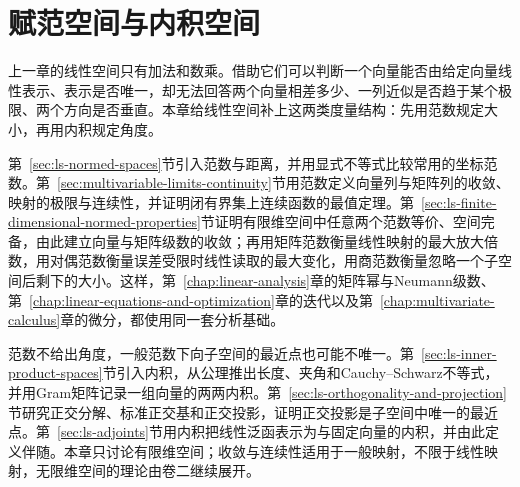 \chapter{赋范空间与内积空间}
\label{chap:normed-inner-product-spaces}

上一章的线性空间只有加法和数乘。借助它们可以判断一个向量能否由给定向量线性表示、表示是否唯一，却无法回答两个向量相差多少、一列近似是否趋于某个极限、两个方向是否垂直。本章给线性空间补上这两类度量结构：先用范数规定大小，再用内积规定角度。

第~\ref{sec:ls-normed-spaces}节引入范数与距离，并用显式不等式比较常用的坐标范数。第~\ref{sec:multivariable-limits-continuity}节用范数定义向量列与矩阵列的收敛、映射的极限与连续性，并证明闭有界集上连续函数的最值定理。第~\ref{sec:ls-finite-dimensional-normed-properties}节证明有限维空间中任意两个范数等价、空间完备，由此建立向量与矩阵级数的收敛；再用矩阵范数衡量线性映射的最大放大倍数，用对偶范数衡量误差受限时线性读取的最大变化，用商范数衡量忽略一个子空间后剩下的大小。这样，第~\ref{chap:linear-analysis}章的矩阵幂与Neumann级数、第~\ref{chap:linear-equations-and-optimization}章的迭代以及第~\ref{chap:multivariate-calculus}章的微分，都使用同一套分析基础。

范数不给出角度，一般范数下向子空间的最近点也可能不唯一。第~\ref{sec:ls-inner-product-spaces}节引入内积，从公理推出长度、夹角和Cauchy--Schwarz不等式，并用Gram矩阵记录一组向量的两两内积。第~\ref{sec:ls-orthogonality-and-projection}节研究正交分解、标准正交基和正交投影，证明正交投影是子空间中唯一的最近点。第~\ref{sec:ls-adjoints}节用内积把线性泛函表示为与固定向量的内积，并由此定义伴随。本章只讨论有限维空间；收敛与连续性适用于一般映射，不限于线性映射，无限维空间的理论由卷二继续展开。




